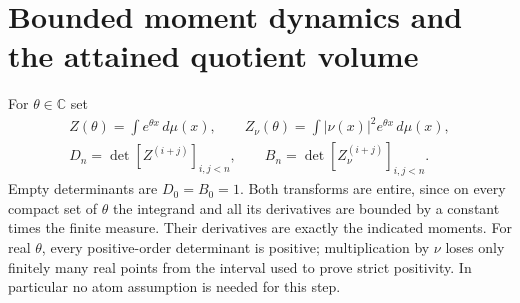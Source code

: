 \documentclass[11pt]{article}
\newcommand{\C}{\mathbb C}
\newcommand{\dd}{\,d}
\begin{document}
\section{Bounded moment dynamics and the attained quotient volume}
For $\theta\in\C$ set
\begin{equation}
 \begin{gathered}
 Z(\theta)=\int e^{\theta x}\dd\mu(x),\qquad
 Z_\nu(\theta)=\int |\nu(x)|^2e^{\theta x}\dd\mu(x),\\
 D_n=\det[Z^{(i+j)}]_{i,j<n},\qquad
 B_n=\det[Z_\nu^{(i+j)}]_{i,j<n}.
 \end{gathered}\label{eq:determinants}
\end{equation}
Empty determinants are $D_0=B_0=1$. Both transforms are entire, since
on every compact set of $\theta$ the integrand and all its derivatives
are bounded by a constant times the finite measure. Their derivatives
are exactly the indicated moments. For real $\theta$, every
positive-order determinant is positive; multiplication by $\nu$ loses
only finitely many real points from the interval used to prove strict
positivity. In particular no atom assumption is needed for this step.
\end{document}
